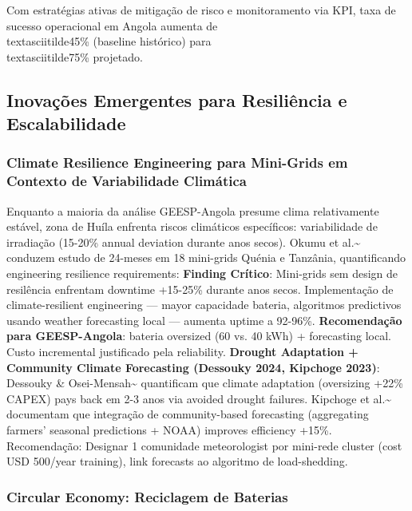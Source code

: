 \documentclass[12pt, a4paper]{article}
\begin{document}
Com estratégias ativas de mitigação de risco e monitoramento via KPI, taxa de sucesso operacional em Angola aumenta de \\textasciitilde45\% (baseline histórico) para \\textasciitilde75\% projetado.

\subsection{Inovações Emergentes para Resiliência e Escalabilidade}

\subsubsection{Climate Resilience Engineering para Mini-Grids em Contexto de Variabilidade Climática}

Enquanto a maioria da análise GEESP-Angola presume clima relativamente estável, zona de Huíla enfrenta riscos climáticos específicos: variabilidade de irradiação (15-20\% annual deviation durante anos secos). Okumu et al.\textasciitilde{}\citep{Okumu2025} conduzem estudo de 24-meses em 18 mini-grids Quénia e Tanzânia, quantificando engineering resilience requirements:
\textbf{Finding Crítico}: Mini-grids sem design de resilência enfrentam downtime +15-25\% durante anos secos. Implementação de climate-resilient engineering — mayor capacidade bateria, algoritmos predictivos usando weather forecasting local — aumenta uptime a 92-96\%.
\textbf{Recomendação para GEESP-Angola}: bateria oversized (60 vs. 40 kWh) + forecasting local. Custo incremental justificado pela reliability.
\textbf{Drought Adaptation + Community Climate Forecasting (Dessouky 2024, Kipchoge 2023)}: Dessouky \& Osei-Mensah\textasciitilde{}\citep{Dessouky2024} quantificam que climate adaptation (oversizing +22\% CAPEX) pays back em 2-3 anos via avoided drought failures. Kipchoge et al.\textasciitilde{}\citep{Kipchoge2023} documentam que integração de community-based forecasting (aggregating farmers' seasonal predictions + NOAA) improves efficiency +15\%. Recomendação: Designar 1 comunidade meteorologist por mini-rede cluster (cost USD 500/year training), link forecasts ao algoritmo de load-shedding.

\subsubsection{Circular Economy: Reciclagem de Baterias}
\end{document}
